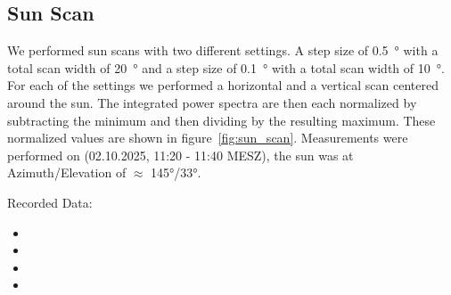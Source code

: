 \subsection{Sun Scan}\label{sec:sun_scan}
We performed sun scans with two different settings.
A step size of \SI{0.5}{\degree} with a total scan width of \SI{20}{\degree} and a step size of \SI{0.1}{\degree} with a total scan width of \SI{10}{\degree}.
For each of the settings we performed a horizontal and a vertical scan centered around the sun.
The integrated power spectra are then each normalized by subtracting the minimum and then dividing by the resulting maximum.
These normalized values are shown in figure~\ref{fig:sun_scan}.
Measurements were performed on (02.10.2025, 11:20 - 11:40 MESZ), the sun was at Azimuth/Elevation of $\approx$ 145°/33°.

Recorded Data:
\begin{itemize}
    \item {}
    \item {}
    \item {}
    \item {}
\end{itemize}


